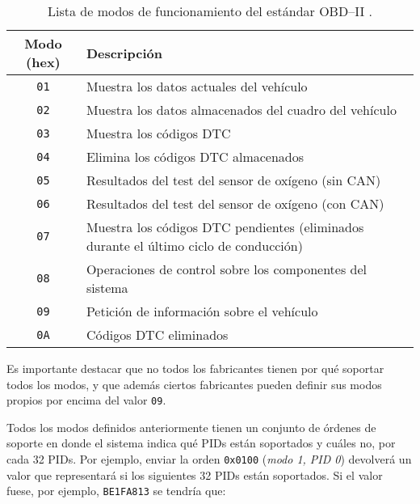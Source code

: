 \begin{table}[H]
  \centering
  \begin{tabularx}{\textwidth}{ | c | X | }
    \hline
    \textbf{Modo (hex)} & \textbf{Descripción}                                                                       \\
    \hline
    \texttt{01}         & Muestra los datos actuales del vehículo                                                    \\
    \hline
    \texttt{02}         & Muestra los datos almacenados del cuadro del vehículo                                      \\
    \hline
    \texttt{03}         & Muestra los códigos \ac{DTC}                                                               \\
    \hline
    \texttt{04}         & Elimina los códigos \ac{DTC} almacenados                                                   \\
    \hline
    \texttt{05}         & Resultados del test del sensor de oxígeno (sin \ac{CAN})                                   \\
    \hline
    \texttt{06}         & Resultados del test del sensor de oxígeno (con \ac{CAN})                                   \\
    \hline
    \texttt{07}         & Muestra los códigos \ac{DTC} pendientes (eliminados durante el último ciclo de conducción) \\
    \hline
    \texttt{08}         & Operaciones de control sobre los componentes del sistema                                   \\
    \hline
    \texttt{09}         & Petición de información sobre el vehículo                                                  \\
    \hline
    \texttt{0A}         & Códigos \ac{DTC} eliminados                                                                \\
    \hline
  \end{tabularx}
  \caption{Lista de modos de funcionamiento del estándar \ac{OBD}--II \cite{OBDIIPIDs2021}.}
  \label{tab:pids-mode}
\end{table}

Es importante destacar que no todos los fabricantes tienen por qué soportar todos
los modos, y que además ciertos fabricantes pueden definir sus modos propios por encima
del valor \texttt{09}.

Todos los modos definidos anteriormente tienen un conjunto de órdenes de soporte
en donde el sistema indica qué \ac{PID}s están soportados y cuáles no, por cada 32
\ac{PID}s. Por ejemplo, enviar la orden \texttt{0x0100} (\textit{modo 1, PID 0})
devolverá un valor que representará si los siguientes 32 \ac{PID}s están soportados.
Si el valor fuese, por ejemplo, \texttt{BE1FA813} se tendría que:

